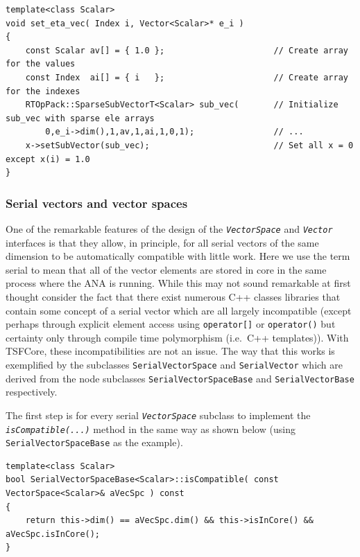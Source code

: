 {\scriptsize\begin{verbatim}
template<class Scalar>
void set_eta_vec( Index i, Vector<Scalar>* e_i )
{
    const Scalar av[] = { 1.0 };                      // Create array for the values
    const Index  ai[] = { i   };                      // Create array for the indexes
    RTOpPack::SparseSubVectorT<Scalar> sub_vec(       // Initialize sub_vec with sparse ele arrays
        0,e_i->dim(),1,av,1,ai,1,0,1);                // ...
    x->setSubVector(sub_vec);                         // Set all x = 0 except x(i) = 1.0
}
\end{verbatim}}

%
\subsubsection{Serial vectors and vector spaces}
\label{tsfcore:sec:serial_vecs}
%

One of the remarkable features of the design of the
\texttt{\textit{VectorSpace}} and \texttt{\textit{Vector}} interfaces
is that they allow, in principle, for all serial vectors of the same
dimension to be automatically compatible with little work.  Here we
use the term serial to mean that all of the vector elements are stored
in core in the same process where the ANA is running.  While this may
not sound remarkable at first thought consider the fact that there
exist numerous C++ classes libraries that contain some concept of a
serial vector \cite{ref:lumsdaine_and_siek_1998, ref:tnt,
ref:roberts_et_al_1996, ref:math++_1996} which are all largely
incompatible (except perhaps through explicit element access using
\texttt{operator[]} or \texttt{operator()} but certainty only
through compile time polymorphism (i.e.~C++ templates)).  With
TSFCore, these incompatibilities are not an issue.  The way that this
works is exemplified by the subclasses \texttt{SerialVectorSpace} and
\texttt{SerialVector} which are derived from the node subclasses
\texttt{Serial\-VectorSpace\-Base} and
\texttt{SerialVectorBase} respectively.

The first step is for every serial \texttt{\textit{VectorSpace}}
subclass to implement the \texttt{\textit{isCompatible(\-...)}}  method
in the same way as shown below (using \texttt{SerialVectorSpaceBase}
as the example).

{\scriptsize\begin{verbatim}
template<class Scalar>
bool SerialVectorSpaceBase<Scalar>::isCompatible( const VectorSpace<Scalar>& aVecSpc ) const
{
    return this->dim() == aVecSpc.dim() && this->isInCore() && aVecSpc.isInCore();
}
\end{verbatim}}

